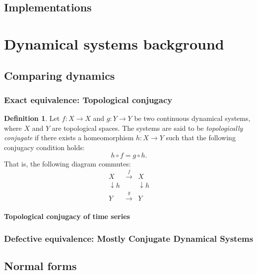 \documentclass{article}
\theoremstyle{definition} \newtheorem{definition}{Definition}  \newtheorem{example}{Example}
\theoremstyle{remark} \newtheorem{remark}{Remark}
\newcounter{ct}
\begin{document}
\subsection{Implementations}
\citep{miolane2020geomstats}





\newpage
\section{Dynamical systems background}

\subsection{Comparing dynamics}
\subsubsection{Exact equivalence: Topological conjugacy}\label{sec:top_conj}
\begin{definition}\label{def:top_conj}
Let \( f: X \to X \) and \( g: Y \to Y \) be two continuous dynamical systems, where \( X \) and \( Y \) are topological spaces.
 The systems are said to be \emph{topologically conjugate} if there exists a homeomorphism \( h: X \to Y \) such that the following conjugacy condition holds:
\[
h \circ f = g \circ h.
\]
That is, the following diagram commutes:
\[
\begin{array}{ccc}
X & \xrightarrow{f} & X \\
\downarrow h &  & \downarrow h \\
Y & \xrightarrow{g} & Y
\end{array}
\]
\end{definition}

\paragraph{Topological conjugacy of time series}
\citep{dlotko2024topconj}

\subsubsection{Defective equivalence: Mostly Conjugate Dynamical Systems}
\citep{skufca2007relaxing, skufca2008mostlyconjugate, bollt2010comparing}




\subsection{Normal forms}
\end{document}
